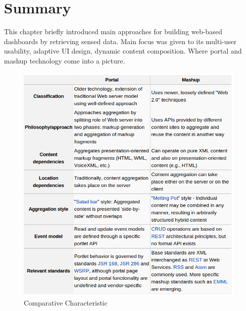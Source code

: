 \section{Summary}
This chapter briefly introduced main approaches for building web-based dashboards by retrieving sensed data. Main focus was given to its multi-user usability, adaptive UI design, dynamic content composition. Where portal and mashup technology come into a picture. 
\begin{figure}[!ht]
\centering
\includegraphics[scale=0.8]{images/MashupVsPortal.png}   
\caption[Comparative Characteristic of Approaches]{Comparative Characteristic}
\label{img:comparative characteristic}                           
\end{figure}
